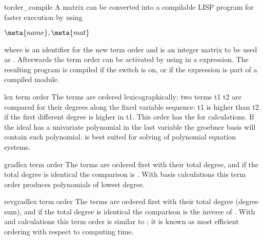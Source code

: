 \begin{Operator}{torder_compile}
A matrix can be converted into
a compilable LISP program for faster execution by using
\begin{Syntax}
    \(\meta{name},\meta{mat}\)
\end{Syntax}
where  is an identifier for the new term order and 
is an integer matrix to be used as . Afterwards
the term order can be activated by using  in a 
expression. The resulting program is compiled if the switch 
is on, or if the   expression is part of a compiled
module.
\end{Operator}
\begin{Concept}{lex term order}
The terms are ordered lexicographically: two terms t1 t2 
are compared for their degrees 
along the fixed variable sequence: t1 is higher than t2
if the first different degree is higher in t1.
This order has the 
for  calculations.
If the ideal has a univariate polynomial in the last
variable the groebner basis will contain
such polynomial.  is best
suited for solving of polynomial equation systems.

\end{Concept}

\begin{Concept}{gradlex term order}
The terms are ordered first with their total
degree, and if the total degree is identical
the comparison is .
With  basis calculations this term order
produces polynomials of lowest degree.
\end{Concept}

\begin{Concept}{revgradlex term order}
The terms are ordered first with their total
degree (degree sum), and if the total degree is identical
the comparison is the inverse of .
With  and  
calculations this term order
is similar to ; it is known
as most efficient ordering with respect to computing time.
\end{Concept}

